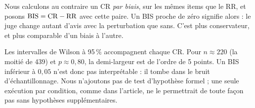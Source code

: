 Nous calculons au contraire un CR \emph{par biais}, sur les mêmes items que le RR, et posons $\mathrm{BIS} = \mathrm{CR} - \mathrm{RR}$ avec cette paire. Un BIS proche de zéro signifie alors : le juge change autant d'avis avec la perturbation que sans. C'est plus conservateur, et plus comparable d'un biais à l'autre.

Les intervalles de Wilson \cite{wilson1927} à 95\,\% accompagnent chaque CR. Pour $n \approx 220$ (la moitié de 439) et $p \approx 0{,}80$, la demi-largeur est de l'ordre de 5 points. Un BIS inférieur à $0{,}05$ n'est donc pas interprétable : il tombe dans le bruit d'échantillonnage. Nous n'ajoutons pas de test d'hypothèse formel ; une seule exécution par condition, comme dans l'article, ne le permettrait de toute façon pas sans hypothèses supplémentaires.
